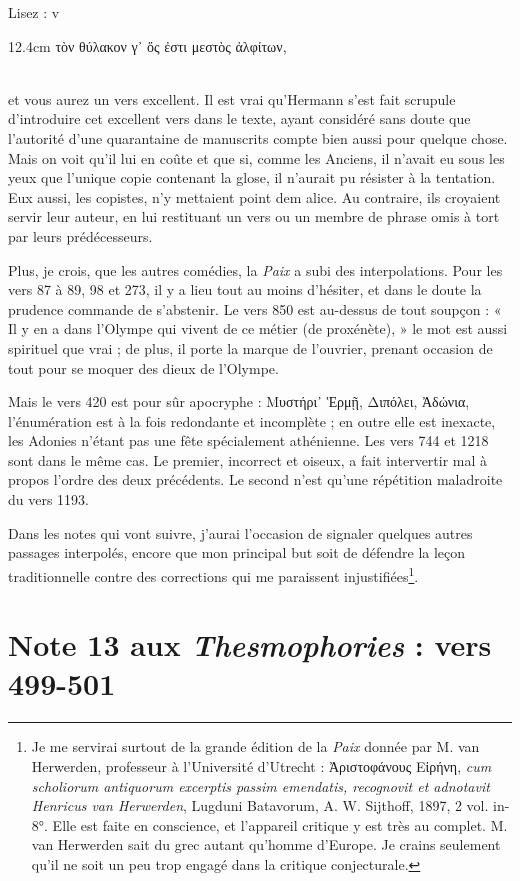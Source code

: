 \documentclass{book}%
\newcommand{\italique}[1]{\textit{#1}}%
\newcommand{\espace}[1]{\hspace{#1}}%
\newcommand{\fantome}{{\color{white}v}}
\newcommand{\Note}[1]{\section*{#1}%
\addcontentsline{toc}{section}{#1}}
\newcommand{\note}[1]{\footnote{#1}}
\newcommand{\citComm}[1]{\fantome\\
\espace{1cm}\begin{minipagewithmarginpars}{12.4cm}%
#1
\end{minipagewithmarginpars}%
}
\begin{document}
Lisez : 
\citComm{τὸν θύλακον γ᾽ ὅς ἐστι μεστὸς ἀλφίτων,}\\ 
et vous aurez un vers excellent. Il est vrai qu'Hermann s'est fait scrupule d'introduire cet excellent vers dans le texte, ayant considéré sans doute que l'autorité d'une quarantaine de manuscrits compte bien aussi pour quelque chose. Mais on voit qu'il lui en coûte et que si, comme les Anciens, il n'avait eu sous les yeux que l'unique copie contenant la glose, il n'aurait pu résister à la tentation. Eux aussi, les copistes, n'y mettaient point dem alice. Au contraire, ils croyaient servir leur auteur, en lui restituant un vers ou un membre de phrase omis à tort par leurs prédécesseurs. 

Plus, je crois, que les autres comédies, la \italique{Paix} a subi des interpolations. Pour les vers 87 à 89, 98 et 273, il y a lieu tout au moins d'hésiter, et dans le doute la prudence commande de s'abstenir. Le vers 850 est au-dessus de tout soupçon : « Il y en a dans l'Olympe qui vivent de ce métier (de proxénète), » le mot est aussi spirituel que vrai ; de plus, il porte la marque de l'ouvrier, prenant occasion de tout pour se moquer des dieux de l'Olympe. 

Mais le vers 420 est pour sûr apocryphe : Μυστήρι᾽ Ἑρμῇ, Διπόλει, Ἀδώνια, l'énumération est à la fois redondante et incomplète ; en outre elle est inexacte, les Adonies n'étant pas une fête spécialement athénienne. Les vers 744 et 1218 sont dans le même cas. Le premier, incorrect et oiseux, a fait intervertir mal à propos l'ordre des deux précédents. Le second n'est qu'une répétition maladroite du vers 1193. 

Dans les notes qui vont suivre, j'aurai l'occasion de signaler quelques autres passages interpolés, encore que mon principal but soit de défendre la leçon traditionnelle contre des corrections qui me paraissent injustifiées\note{Je me servirai surtout de la grande édition de la \italique{Paix} donnée par M. van Herwerden, professeur à l'Université d'Utrecht : Ἀριστοφάνους Εἰρήνη, \italique{cum scholiorum antiquorum excerptis passim emendatis, recognovit et adnotavit Henricus van Herwerden}, Lugduni Batavorum, A. W. Sijthoff, 1897, 2 vol. in-8°. Elle est faite en conscience, et l'appareil critique y est très au complet. M. van Herwerden sait du grec autant qu'homme d'Europe. Je crains seulement qu'il ne soit un peu trop engagé dans la critique conjecturale.}.



\Note{Note 13 aux \italique{Thesmophories} : vers 499-501}
\end{document}
